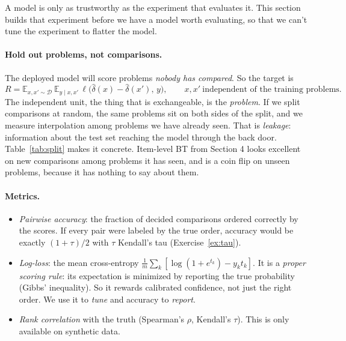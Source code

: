 \documentclass[11pt]{article}
\theoremstyle{definition}
\theoremstyle{plain}
\theoremstyle{remark}
\newcommand{\E}{\mathbb{E}}
\renewcommand{\_}{\oldunderscore\allowbreak}
\begin{document}
A model is only as trustworthy as the experiment that evaluates it. This section builds
that experiment before we have a model worth evaluating, so that we can't tune the experiment to flatter the model.

\paragraph{Hold out problems, not comparisons.}
The deployed model will score problems \emph{nobody has compared}. So the target is
\[
  R=\E_{x,x'\sim\mathcal D}\ \E_{y\mid x,x'}\,\ell\bigl(\hat\delta(x)-\hat\delta(x'),\,y\bigr),
  \qquad x,x'\ \text{independent of the training problems.}
\]
The independent unit, the thing that is exchangeable, is the \emph{problem}. If we split
comparisons at random, the same problems sit on both sides of the split, and we measure interpolation among problems we
have already seen. That is \emph{leakage}: information about the test set reaching the model through the back door.
Table~\ref{tab:split} makes it concrete. Item-level BT from Section 4 looks excellent on new
comparisons among problems it has seen, and is a coin flip on unseen problems, because it has nothing to say about them.

\begin{table}[h]\centering\small

\caption{The same two models under two evaluation protocols (synthetic instructor; 200 training problems, 200 unseen).}\label{tab:split}
\end{table}

\paragraph{Metrics.}
\begin{itemize}[nosep]
\item \emph{Pairwise accuracy}: the fraction of decided comparisons ordered correctly by the scores.
  If every pair were labeled by the true order, accuracy would be exactly $(1+\tau)/2$ with $\tau$ Kendall's tau (Exercise~\ref{ex:tau}).
\item \emph{Log-loss}: the mean cross-entropy $\frac1m\sum_k[\log(1+e^{t_k})-y_kt_k]$. It is a \emph{proper scoring rule}:
  its expectation is minimized by reporting the true probability (Gibbs' inequality). So it rewards calibrated
  confidence, not just the right order. We use it to \emph{tune} and accuracy to \emph{report}.
\item \emph{Rank correlation} with the truth (Spearman's $\rho$, Kendall's $\tau$). This is only available on synthetic data.
\end{itemize}
\end{document}
